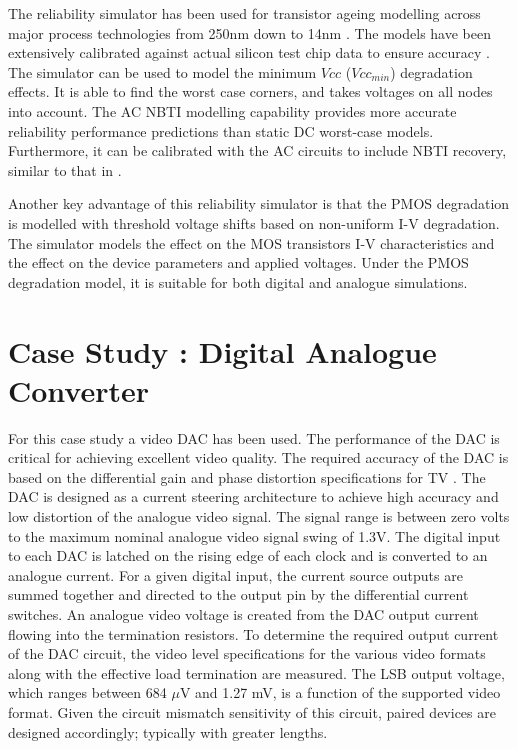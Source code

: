 \documentclass[11pt,a4paper]{article}
\begin{document}
The reliability simulator has been used for transistor ageing modelling across major process technologies from 250nm down to 14nm  \cite{Arend}.  The models have been extensively calibrated against  actual silicon test chip data to ensure accuracy \cite{Arend}. The simulator 
can be used to model the minimum $Vcc$ ($Vcc_{min}$) degradation effects. It is able to find the worst case corners,
and takes voltages on all nodes into account. The AC NBTI modelling capability provides more accurate reliability performance predictions than static DC worst-case models. Furthermore, it can be calibrated with the AC circuits to include NBTI recovery, similar to that in \cite{Kufluoglu}.

Another key advantage of this reliability simulator is that the PMOS degradation is modelled with threshold voltage shifts based on  non-uniform I-V degradation. The simulator  models the effect on the MOS transistors I-V characteristics  and the effect on the device parameters and applied voltages. Under the PMOS degradation model, it is suitable for both  digital and analogue simulations.


\section{Case Study : Digital Analogue Converter}




For this case study a video DAC has been used. The performance of the DAC is critical for achieving excellent video quality. The required accuracy of the DAC is based on the differential gain and phase distortion specifications for TV \cite{Wu}. The DAC is designed as a current steering architecture to achieve high accuracy and low distortion of the analogue video signal. The signal range is between zero volts to the maximum nominal analogue video signal swing of 1.3V. The digital input to each DAC is latched on the rising edge of each clock and is converted to an analogue current. For a given digital input, the current source outputs are summed together and directed to the output pin by the differential current switches. An analogue video voltage is created from the DAC output current flowing into the termination resistors. To determine the required output current of the DAC circuit, the video level specifications for the various video formats along with the effective load termination are measured. The LSB output voltage, which ranges between 684 $\mu$V and 1.27 mV, is a function of the supported video format.
Given the circuit mismatch sensitivity of this circuit, paired devices are designed accordingly; typically with greater lengths. 
\end{document}
